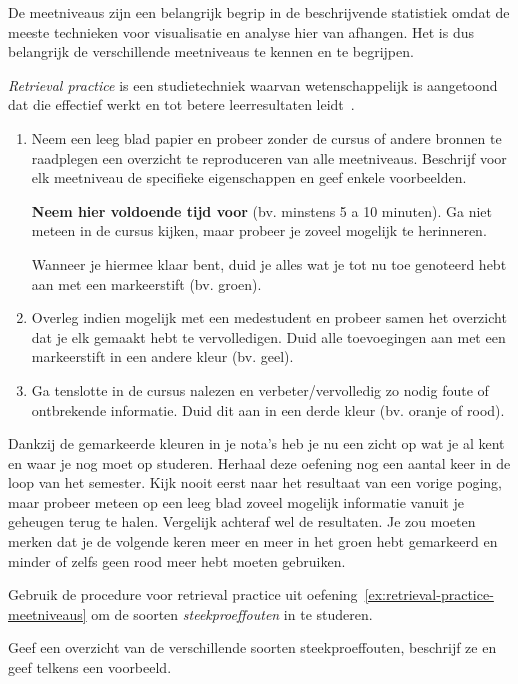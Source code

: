 \begin{exercise}
  \label{ex:retrieval-practice-meetniveaus}
  De meetniveaus zijn een belangrijk begrip in de beschrijvende statistiek omdat de meeste technieken voor visualisatie en analyse hier van afhangen. Het is dus belangrijk de verschillende meetniveaus te kennen en te begrijpen.
  
  \emph{Retrieval practice} is een studietechniek waarvan wetenschappelijk is aangetoond dat die effectief werkt en tot betere leerresultaten leidt~\parencite{RoedigerKarpicke2006}.
  
  \begin{enumerate}[label=\alph*.]
    \item Neem een leeg blad papier en probeer zonder de cursus of andere bronnen te raadplegen een overzicht te reproduceren van alle meetniveaus. Beschrijf voor elk meetniveau de specifieke eigenschappen en geef enkele voorbeelden.
    
    \textbf{Neem hier voldoende tijd voor} (bv. minstens 5 a 10 minuten). Ga niet meteen in de cursus kijken, maar probeer je zoveel mogelijk te herinneren.
    
    Wanneer je hiermee klaar bent, duid je alles wat je tot nu toe genoteerd hebt aan met een markeerstift (bv. groen).
    
    \item Overleg indien mogelijk met een medestudent en probeer samen het overzicht dat je elk gemaakt hebt te vervolledigen. Duid alle toevoegingen aan met een markeerstift in een andere kleur (bv. geel).
    
    \item Ga tenslotte in de cursus nalezen en verbeter/vervolledig zo nodig foute of ontbrekende informatie. Duid dit aan in een derde kleur (bv. oranje of rood).
  \end{enumerate}

  Dankzij de gemarkeerde kleuren in je nota's heb je nu een zicht op wat je al kent en waar je nog moet op studeren. Herhaal deze oefening nog een aantal keer in de loop van het semester. Kijk nooit eerst naar het resultaat van een vorige poging, maar probeer meteen op een leeg blad zoveel mogelijk informatie vanuit je geheugen terug te halen. Vergelijk achteraf wel de resultaten. Je zou moeten merken dat je de volgende keren meer en meer in het groen hebt gemarkeerd en minder of zelfs geen rood meer hebt moeten gebruiken.
\end{exercise}

\begin{exercise}
  Gebruik de procedure voor retrieval practice uit oefening~\ref{ex:retrieval-practice-meetniveaus} om de soorten \emph{steekproeffouten} in te studeren.
  
  Geef een overzicht van de verschillende soorten steekproeffouten, beschrijf ze en geef telkens een voorbeeld.
\end{exercise}